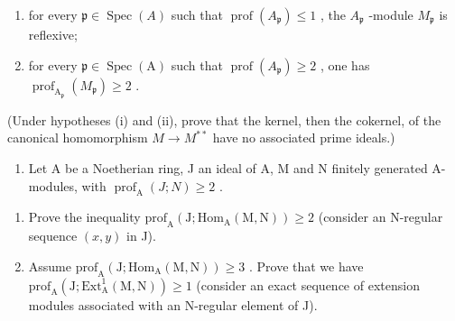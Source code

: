 \begin{enumerate}
\def\labelenumi{(\roman{enumi})}
\item
  for every \(\mathfrak{p} \in \operatorname{Spec}(A)\) such that \(\operatorname{prof}(A_{\mathfrak{p}}) \leqslant 1\) , the \(A_{\mathfrak{p}}\) -module \(M_{\mathfrak{p}}\) is reflexive;
\item
  for every \(\mathfrak{p} \in \operatorname{Spec}(\mathrm{A})\) such that \(\operatorname{prof}(A_{\mathfrak{p}}) \geqslant 2\) , one has \(\operatorname{prof}_{\mathrm{A}_{\mathfrak{p}}} (M_{\mathfrak{p}}) \geqslant 2\) .
\end{enumerate}

(Under hypotheses (i) and (ii), prove that the kernel, then the cokernel, of the canonical homomorphism \(M \to M^{**}\) have no associated prime ideals.)

\begin{enumerate}
\def\labelenumi{\arabic{enumi})}
\setcounter{enumi}{17}
\tightlist
\item
  Let A be a Noetherian ring, J an ideal of A, M and N finitely generated A-modules, with \(\operatorname{prof}_{\mathrm{A}}(J;N)\geqslant2\) .
\end{enumerate}

\begin{enumerate}
\def\labelenumi{\alph{enumi})}
\item
  Prove the inequality \(\mathrm{prof}_{\mathrm{A}}(\mathrm{J};\mathrm{Hom}_{\mathrm{A}}(\mathrm{M},\mathrm{N}))\geqslant 2\) (consider an N-regular sequence \((x,y)\) in J).
\item
  Assume \(\mathrm{prof}_{\mathrm{A}}(\mathrm{J};\mathrm{Hom}_{\mathrm{A}}(\mathrm{M},\mathrm{N}))\geqslant 3\) . Prove that we have \(\mathrm{prof}_{\mathrm{A}}(\mathrm{J};\mathrm{Ext}_{\mathrm{A}}^{1}(\mathrm{M},\mathrm{N}))\geqslant 1\) (consider an exact sequence of extension modules associated with an N-regular element of J).
\end{enumerate}

